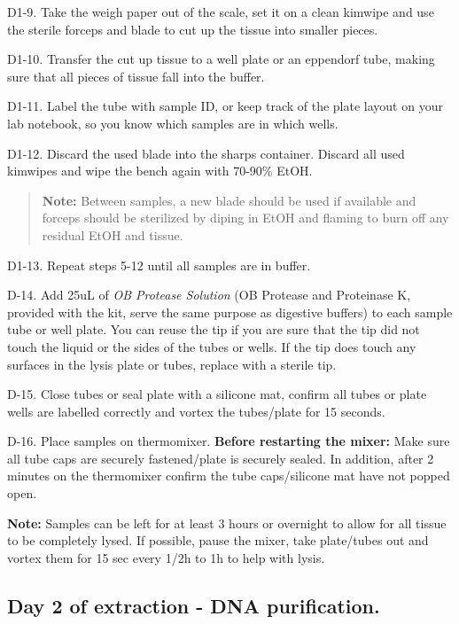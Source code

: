 \documentclass[
  letterpaper,
  DIV=11,
  numbers=noendperiod]{scrreprt}
\begin{document}
D1-9. Take the weigh paper out of the scale, set it on a clean kimwipe
and use the sterile forceps and blade to cut up the tissue into smaller
pieces.

D1-10. Transfer the cut up tissue to a well plate or an eppendorf tube,
making sure that all pieces of tissue fall into the buffer.

D1-11. Label the tube with sample ID, or keep track of the plate layout
on your lab notebook, so you know which samples are in which wells.

D1-12. Discard the used blade into the sharps container. Discard all
used kimwipes and wipe the bench again with 70-90\% EtOH.

\begin{quote}
\textbf{Note:} Between samples, a new blade should be used if available
and forceps should be sterilized by diping in EtOH and flaming to burn
off any residual EtOH and tissue.
\end{quote}

D1-13. Repeat steps 5-12 until all samples are in buffer.

D-14. Add 25uL of \emph{OB Protease Solution} (OB Protease and
Proteinase K, provided with the kit, serve the same purpose as digestive
buffers) to each sample tube or well plate. You can reuse the tip if you
are sure that the tip did not touch the liquid or the sides of the tubes
or wells. If the tip does touch any surfaces in the lysis plate or
tubes, replace with a sterile tip.

D-15. Close tubes or seal plate with a silicone mat, confirm all tubes
or plate wells are labelled correctly and vortex the tubes/plate for 15
seconds.

D-16. Place samples on thermomixer. \textbf{Before restarting the
mixer:} Make sure all tube caps are securely fastened/plate is securely
sealed. In addition, after 2 minutes on the thermomixer confirm the tube
caps/silicone mat have not popped open.

\textbf{Note:} Samples can be left for at least 3 hours or overnight to
allow for all tissue to be completely lysed. If possible, pause the
mixer, take plate/tubes out and vortex them for 15 sec every 1/2h to 1h
to help with lysis.

\hypertarget{day-2-of-extraction---dna-purification.}{%
\subsection*{\texorpdfstring{\textbf{Day 2 of extraction - DNA
purification.}}{Day 2 of extraction - DNA purification.}}\label{day-2-of-extraction---dna-purification.}}
\end{document}
